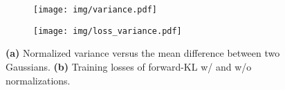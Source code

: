 \begin{figure}
    \centering
  \begin{subfigure}[b]{0.234\textwidth}
    \texttt{[image: img/variance.pdf]}
    \caption{}
     \label{fig:var}
  \end{subfigure}
    \begin{subfigure}[b]{0.234\textwidth}
    \texttt{[image: img/loss\_variance.pdf]}
    \caption{}
      \label{fig:var-loss}
  \end{subfigure}
    \caption{\textbf{(a)} Normalized variance versus the mean difference between two Gaussians. \textbf{(b)} Training losses of forward-KL w/ and w/o normalizations. }
\end{figure}



